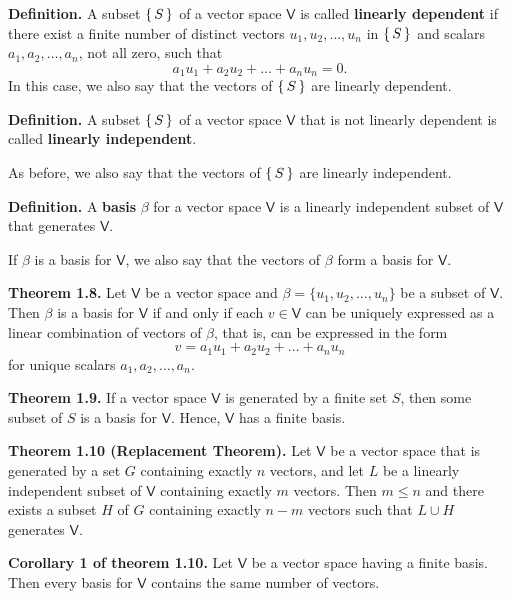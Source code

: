 \documentclass{article}
\newcommand{\0}{\mathit{0}}
\begin{document}
\medskip

\textbf{Definition.}
A subset $\set{S}$ of a vector space $\mathsf{V}$ is called \textbf{linearly
    dependent} if there exist a finite number of distinct vectors
$u_1, u_2, \dots, u_n$ in $\set{S}$ and scalars $a_1, a_2, \dots, a_n$,
not all zero, such that
\[
    a_1 u_1 + a_2 u_2 + \dots + a_n u_n = \0.
\]
In this case, we also say that the vectors of $\set{S}$ are linearly dependent.

\medskip

\textbf{Definition.}
A subset $\set{S}$ of a vector space $\mathsf{V}$ that is not linearly
dependent is called \textbf{linearly independent}.

As before, we also say that the vectors of $\set{S}$ are linearly independent.

\medskip

\textbf{Definition.}
A \textbf{basis} $\beta$ for a vector space $\mathsf{V}$ is a linearly independent
subset of $\mathsf{V}$ that generates $\mathsf{V}$.

If $\beta$ is a basis for $\mathsf{V}$, we also say that the vectors of
$\beta$ form a basis for $\mathsf{V}$.

\medskip

\textbf{Theorem 1.8.} Let $\mathsf{V}$ be a vector space and
$\beta = \{ u_1, u_2, \dots, u_n \}$ be a subset of $\mathsf{V}$.
Then $\beta$ is a basis for $\mathsf{V}$ if and only if each
$v \in \mathsf{V}$ can be uniquely expressed as a linear
combination of vectors of $\beta$, that is, can be expressed in the form
\[
    v = a_1 u_1 + a_2 u_2 + \dots + a_n u_n
\]
for unique scalars $a_1, a_2, \dots, a_n$.

\medskip

\textbf{Theorem 1.9.} If a vector space $\mathsf{V}$ is generated by a finite
set $S$, then some subset of $S$ is a basis for $\mathsf{V}$.
Hence, $\mathsf{V}$ has a finite basis.

\medskip

\textbf{Theorem 1.10 (Replacement Theorem).}
Let $\mathsf{V}$ be a vector space that is generated by a set $G$ containing
exactly $n$ vectors, and let $L$ be a linearly independent subset of
$\mathsf{V}$ containing exactly $m$ vectors. Then $m \leq n$ and there
exists a subset $H$ of $G$ containing exactly $n - m$ vectors such that
$L \cup H$ generates $\mathsf{V}$.

\medskip

\textbf{Corollary 1 of theorem 1.10.} Let $\mathsf{V}$ be a vector space having a finite basis.
Then every basis for $\mathsf{V}$ contains the same number of vectors.
\end{document}
